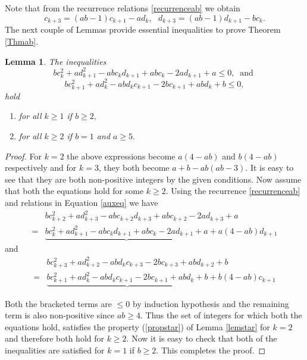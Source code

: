 \documentclass[12pt,reqno]{amsart}
\theoremstyle{plain}
\newtheorem{lem}{Lemma}
\theoremstyle{definition}
\theoremstyle{remark}
\begin{document}
\subsection{} Note that from the recurrence relations \ref{recurrenceab} we obtain
\begin{equation}\label{auxeq}
    c_{k+3}=(ab-1)c_{k+1}-ad_k,\ \ \ d_{k+3}=(ab-1)d_{k+1}-bc_k.
\end{equation}
The next couple of Lemmas provide essential inequalities to prove Theorem \ref{Thmab}.
\begin{lem}\label{lem1}
    The inequalities 
    $$bc_k^2+ad_{k+1}^2-abc_kd_{k+1}+abc_{k}-2ad_{k+1}+a\le 0,\ \text{ and }$$
    $$bc_{k+1}^2+ad_k^2-abd_kc_{k+1}-2bc_{k+1}+abd_k+b\leq 0,$$ hold  
    \begin{enumerate}
        \item for all $k\geq 1$ if $b\geq 2,$
        \item for all $k\geq 2$ if $b=1$ and $a\geq 5.$
    \end{enumerate}
\end{lem}
\begin{proof}
    For $k=2$ the above expressions become $a(4-ab)$ and $b(4-ab)$ respectively and for $k=3$, they both become $a+b-ab(ab-3)$. It is easy to see that they are both non-positive integers by the given conditions. Now assume that both the equations hold for some $k\geq 2.$ Using the recurrence \ref{recurrenceab} and relations in Equation \ref{auxeq} we have 
    \begin{align*}
        &bc_{k+2}^2+ad_{k+3}^2-abc_{k+2}d_{k+3}+abc_{k+2}-2ad_{k+3}+a\\
        =& \underbrace{bc_k^2+ad_{k+1}^2-abc_kd_{k+1}+abc_{k}-2ad_{k+1}+a}+a(4-ab)d_{k+1}
    \end{align*}
    and 
    \begin{align*}
    & bc_{k+3}^2+ad_{k+2}^2-abd_kc_{k+3}-2bc_{k+3}+abd_{k+2}+b\\=&\underbrace{bc_{k+1}^2+ad_k^2-abd_kc_{k+1}-2bc_{k+1}+abd_k+b}+b(4-ab)c_{k+1}
    \end{align*}

    Both the bracketed terms are $\le 0$ by induction hypothesis and the remaining term is also non-positive since $ab\geq 4.$ Thus the set of integers for which both the equations hold, satisfies the property (\ref{propstar}) of Lemma \ref{lemstar} for $k=2$ and therefore both hold for $k\geq 2.$ Now it is easy to check that both of the inequalities are satisfied for $k=1$ if $b\geq 2.$ This completes the proof.
\end{proof}
\end{document}
